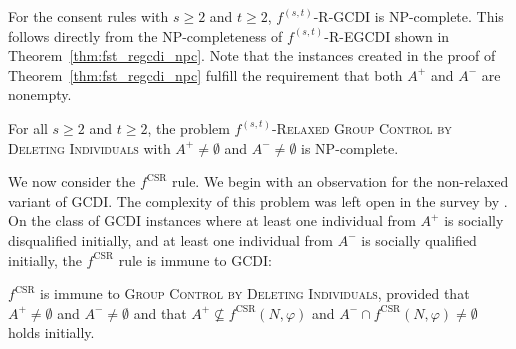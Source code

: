 \documentclass[
    12pt,               %
    a4paper,            %
    bibtotoc,           %
    pointlessnumbers,   %
    ngerman,            %
    titlepage,          %
    leqno,              %
    ]{scrarticle}       %
\newcommand\thmref{Theorem~\ref}
\begin{document}
For the consent rules with $s \geq 2$ and $t \geq 2$, $f^{(s, t)}$-R-GCDI is NP-complete. This follows directly from the NP-completeness of $f^{(s, t)}$-R-EGCDI shown in \thmref{thm:fst_regcdi_npc}. Note that the instances created in the proof of \thmref{thm:fst_regcdi_npc} fulfill the requirement that both $A^+$ and $A^-$ are nonempty.

\begin{Corollary} \label{cor:fst_rgcdi_npc}
For all $s \geq 2$ and $t \geq 2$, the problem $f^{(s, t)}$-\textsc{Relaxed Group Control by Deleting Individuals} with $A^+ \neq \emptyset$ and $A^- \neq \emptyset$ is NP-complete.
\end{Corollary}



We now consider the $f^{\text{CSR}}$ rule. We begin with an observation for the non-relaxed variant of GCDI. The complexity of this problem was left open in the survey by \textcite{J22}. On the class of GCDI instances where at least one individual from $A^+$ is socially disqualified initially, and at least one individual from $A^-$ is socially qualified initially, the $f^{\text{CSR}}$ rule is immune to GCDI:

\begin{Observation} \label{obs:csr_immune_gcdi}
$f^{\text{CSR}}$ is immune to \textsc{Group Control by Deleting Individuals}, provided that $A^+ \neq \emptyset$ and $A^- \neq \emptyset$ and that $A^+ \not\subseteq f^{\text{CSR}}(N, \varphi)$ and $A^- \cap f^{\text{CSR}}(N, \varphi) \neq \emptyset$ holds initially.
\end{Observation}
\end{document}
